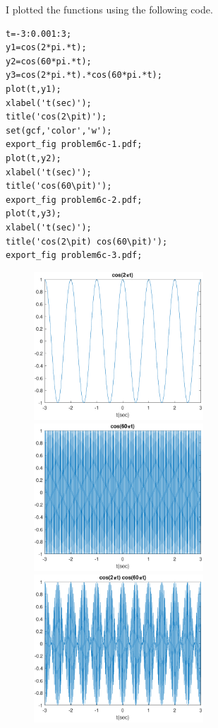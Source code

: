 \documentclass[12pt]{article}
\begin{document}
I plotted the functions using the following code.
\begin{verbatim}
t=-3:0.001:3;
y1=cos(2*pi.*t);
y2=cos(60*pi.*t);
y3=cos(2*pi.*t).*cos(60*pi.*t);
plot(t,y1);
xlabel('t(sec)');
title('cos(2\pit)');
set(gcf,'color','w');
export_fig problem6c-1.pdf;
plot(t,y2);
xlabel('t(sec)');
title('cos(60\pit)');
export_fig problem6c-2.pdf;
plot(t,y3);
xlabel('t(sec)');
title('cos(2\pit) cos(60\pit)');
export_fig problem6c-3.pdf;
\end{verbatim}
\begin{figure}[H]
    \begin{center}
        \includegraphics[width=2.5in]{problem6d-1.pdf}
		\includegraphics[width=2.5in]{problem6d-2.pdf}
		\includegraphics[width=2.5in]{problem6d-3.pdf}
    \end{center}
\end{figure}
\end{document}
